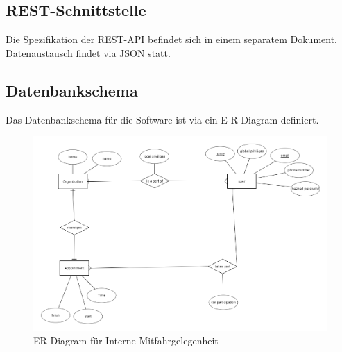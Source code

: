 \documentclass[11pt,a4paper]{article}
\begin{document}
\subsection{REST-Schnittstelle}
Die Spezifikation der REST-API befindet sich in einem separatem Dokument.
Datenaustausch findet via JSON statt.
\subsection{Datenbankschema}
Das Datenbankschema für die Software ist via ein E-R Diagram definiert.\\
\begin{figure}[!htb]
\includegraphics[width=\textwidth]{ER_Diagram.png}
\caption{ER-Diagram für Interne Mitfahrgelegenheit}
\end{figure}
\end{document}
